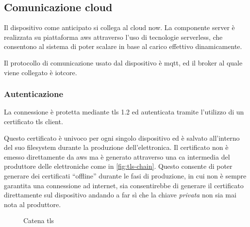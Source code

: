 \documentclass[12pt,a4paper,twoside,titlepage]{book}
\begin{document}
\subsection{Comunicazione cloud}

Il dispositivo come anticipato si collega al \gls{cloud} \Gls{now}. La componente server è 
realizzata su piattaforma \Gls{aws} attraverso l'uso di tecnologie \gls{serverless}, che consentono 
al sistema di poter scalare in base al carico effettivo dinamicamente. 

Il protocollo di comunicazione usato dal dispositivo è \Gls{mqtt}, ed il \gls{broker} al quale 
viene collegato è \Gls{iotcore}. 

\subsubsection{Autenticazione}

La connessione è protetta mediante \acrshort{tls} 1.2 ed autenticata tramite l'utilizzo di un certificato \acrshort{tls} client.

Questo certificato è univoco per ogni singolo dispositivo ed è salvato all'interno del suo filesystem
durante la produzione dell'elettronica. Il certificato non è emesso direttamente da \acrshort{aws} ma 
è generato attraverso una \acrfull{ca} intermedia del produttore delle elettroniche come in \autoref{fig:tls-chain}. 
Questo consente di poter generare dei certificati ``offline'' durante le fasi di produzione, in cui non 
è sempre garantita una connessione ad internet, sia consentirebbe di generare il certificato direttamente 
sul dispositivo andando a far sì che la chiave \textit{privata} non sia mai nota al produttore. 

\begin{figure}[ht]
    \centering
    \caption{Catena \gls{tls}}
    \label{fig:tls-chain}
\end{figure}
\end{document}
